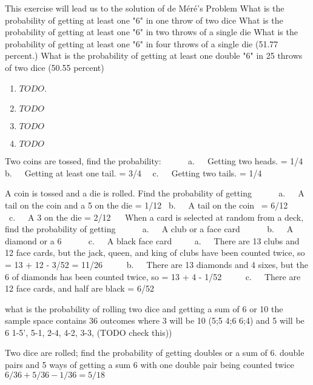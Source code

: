 \begin{ExerciseList}

\Exercise This exercise will lead us to the solution of de Méré's Problem
\Question What is the probability of getting at least one "6" in one throw of two dice
\Question What is the probability of getting at least one "6" in two throws of a single die
\Question What is the probability of getting at least one "6" in four throws of a single die (51.77 percent.)
\Question What is the probability of getting at least one double "6" in 25 throws of two dice (50.55 percent)
\Answer
\begin{enumerate}
 \item\myindent $TODO$.
 \item\myindent $TODO$
 \item\myindent $TODO$
 \item\myindent $TODO$
\end{enumerate}

\Exercise Two coins are tossed, find the probability:      
a.   Getting two heads. = 1/4
b.   Getting at least one tail. = 3/4  
c.   Getting two tails. = 1/4

\Exercise A coin is tossed and a die is rolled. Find the probability of getting     
 a.   A tail on the coin and a 5 on the die = 1/12
 b.   A tail on the coin  = 6/12    
 c.   A 3 on the die = 2/12
  
\Exercise When a card is selected at random from a deck, find the probability of getting      
a.   A club or a face card      
b.   A diamond or a 6      
c.   A black face card
\Answer    
a.   There are 13 clubs and 12 face cards, but the jack, queen, and king of clubs have been counted twice, so = 13 + 12 - 3/52 = 11/26     
b.   There are 13 diamonds and 4 sixes, but the 6 of diamonds has been counted twice, so = 13 + 4 - 1/52     
c.   There are 12 face cards, and half are black = 6/52

\Exercise what is the probability of rolling two dice and getting a sum of 6 or 10
\Answer the sample space contains 36 outcomes where 3 will be 10 (5;5 4;6 6;4) and 5 will be 6 1-5', 5-1, 2-4, 4-2, 3-3, (TODO check this))

\Exercise Two dice are rolled; find the probability of getting doubles or a sum of 6.
 double pairs and 5 ways of getting a sum 6 with one double pair being counted twice $6/36 + 5/36 - 1/36 = 5/18$


\end{ExerciseList}
